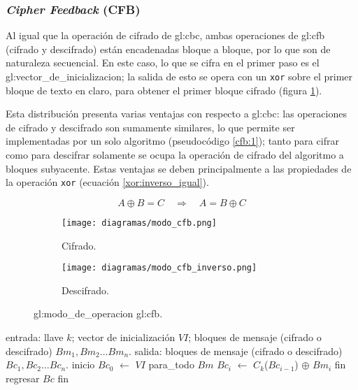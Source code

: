%
%

\subsubsection{\textit{Cipher Feedback} (CFB)}

Al igual que la operación de cifrado de \gls{gl:cbc}, ambas operaciones
de \gls{gl:cfb} (cifrado y descifrado) están encadenadas bloque a bloque,
por lo que son de naturaleza secuencial. En este caso, lo que se cifra en el
primer paso es el \gls{gl:vector_de_inicializacion}; la salida de esto se opera
con un \verb|xor| sobre el primer bloque de texto en claro, para obtener el
primer bloque cifrado (figura \ref{fig:cfb}).

Esta distribución presenta varias ventajas con respecto a \gls{gl:cbc}:
las operaciones de cifrado y descifrado son sumamente similares, lo que permite
ser implementadas por un solo algoritmo (pseudocódigo \ref{cfb:1}); tanto para
cifrar como para descifrar solamente se ocupa la operación de cifrado del
algoritmo a bloques subyacente. Estas ventajas se deben principalmente a las
propiedades de la operación \verb|xor| (ecuación \ref{xor:inverso_igual}).

\begin{equation}
  \label{xor:inverso_igual}
  A \oplus B = C \quad \Rightarrow \quad A = B \oplus C
\end{equation}

\begin{figure}[H]
  \centering
  \begin{subfigure}{0.45\textwidth}
    \begin{center}
      \texttt{[image: diagramas/modo\_cfb.png]}
      \caption{Cifrado.}
    \end{center}
  \end{subfigure}
  \begin{subfigure}{0.45\textwidth}
    \begin{center}
      \texttt{[image: diagramas/modo\_cfb\_inverso.png]}
      \caption{Descifrado.}
    \end{center}
  \end{subfigure}
  \caption{\Gls{gl:modo_de_operacion} \gls{gl:cfb}.}
  \label{fig:cfb}
\end{figure}

\begin{pseudocodigo}[%
    caption={\Gls{gl:modo_de_operacion} \gls{gl:cfb}%
      (cifrado y descifrado).},
    label={cfb:1}%
  ]
  entrada: llave $ k $; vector de inicialización $ VI $;
           bloques de mensaje (cifrado o descifrado) $ Bm_1, Bm_2 \dots Bm_n $.
  salida:  bloques de mensaje (cifrado o descifrado) $ Bc_1, Bc_2 \dots Bc_n $.
  inicio
    $Bc_0$ $\gets$ $ VI $
    para_todo $Bm$
      $Bc_i$ $\gets$ $C_k$($Bc_{i - 1}$) $\oplus$ $Bm_i$
    fin
    regresar $Bc$
  fin
\end{pseudocodigo}
